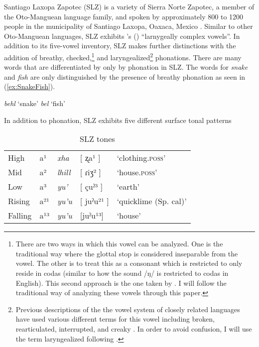 \documentclass[12pt, letterpaper]{article}
\providecommand{\lsptoprule}{\midrule\toprule}
\providecommand{\lspbottomrule}{\bottomrule\midrule}
\begin{document}
Santiago Laxopa Zapotec (SLZ) is a variety of Sierra Norte Zapotec, a member of the Oto-Manguean language family, and spoken by approximately 800 to 1200 people in the municipality of Santiago Laxopa, Oaxaca, Mexico \citep{adlerDerivationVerbInitiality2018,sichelPronounsAttractionSierra2020}. Similar to other Oto-Manguean languages, SLZ exhibits \citeauthor{silvermanLaryngealComplexityOtomanguean1997}'s (\citeyear{silvermanLaryngealComplexityOtomanguean1997}) ``larnygeally complex vowels''. In addition to its five-vowel inventory, SLZ makes further distinctions with the addition of breathy, checked,\footnote{There are two ways in which this vowel can be analyzed. One is the traditional way where the glottal stop is considered inseparable from the vowel. The other is to treat this as a consonant which is restricted to only reside in codas (similar to how the sound /ŋ/ is restricted to codas in English). This second approach is the one taken by \citet{avelinobecerraTopicsYalalagZapotec2004}. I will follow the traditional way of analyzing these vowels through this paper.} and laryngealized\footnote{Previous descriptions of the the vowel system of closely related languages have used various different terms for this vowel including broken, rearticulated, interrupted, and creaky \citep{longDiccionarioZapotecoSan2005,avelinoAcousticElectroglottographicAnalyses2010,avelinobecerraTopicsYalalagZapotec2004,sonnenscheinDescriptiveGrammarSan2005,adlerAcousticsPhonationTypes2016}. In order to avoid confusion, I will use the term laryngealized following \citet{avelinoAcousticElectroglottographicAnalyses2010}.} phonations. There are many words that are differentiated by only by phonation in SLZ. The words for \emph{snake} and \emph{fish} are only distinguished by the presence of breathy phonation as seen in (\ref{ex:SnakeFish}). 

\ea \label{ex:SnakeFish}
	\ea \textit{behl} `snake'
	\ex \textit{bel} `fish'
	\z  
\z 
	



In addition to phonation, SLZ exhibits five different surface tonal patterns 

\begin{table}[!h]
\centering
\caption{SLZ tones}
\label{tab:tones}
 \begin{tabular}{lllll}
  \lsptoprule
  High   	&  a¹  &  \textit{xha}   &  [ ʐa¹ ] & `clothing.\textsc{poss}'\\
	Mid    	&  a²  &  \textit{lhill} 	& [ ɾiʒ² ] & `house.\textsc{poss}' \\
	Low   	&  a³  &  \textit{yu'} 	&	 [ çuˀ³ ] & `earth'\\
	Rising	&  a²¹  &  \textit{yu'u} 	&	[ juˀu²¹ ] & `quicklime (Sp. cal)' \\
	Falling &  a¹³  &  \textit{yu'u}  &	[juˀu¹³] &	`house' \\
  \lspbottomrule
 \end{tabular}
\end{table}
\end{document}
